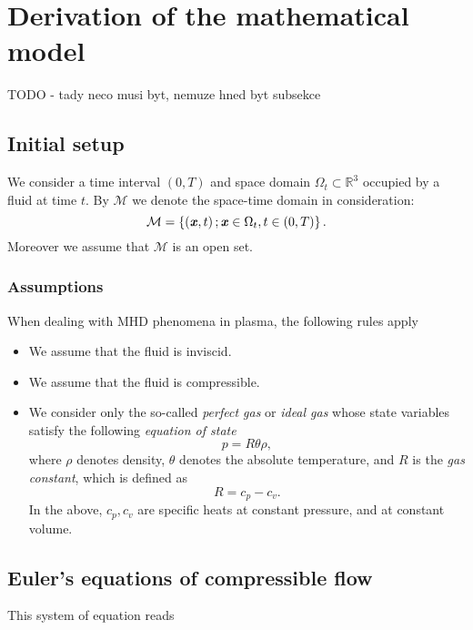 \section{Derivation of the mathematical model}
TODO - tady neco musi byt, nemuze hned byt subsekce
\subsection{Initial setup}

We consider a time interval $\left(0,T\right)$ and space domain $\Omega_{t}\subset \mathbb{R}^3$ occupied by a fluid at time $t$.
By $\mathcal{M}$ we denote the space-time domain in consideration: 
\begin{equation}\label{M}
\mathcal{M}=\left\{\left(\textbf{\textit{x}},t\right);\\\textbf{\textit{x}}\in\Omega_{t},t\in\left(0,T\right)\right \}.
\end{equation}
Moreover we assume that $\mathcal{M}$ is an open set.

\subsubsection{Assumptions}
When dealing with MHD phenomena in plasma, the following rules apply
\begin{itemize}
    \item We assume that the fluid is inviscid.
    \item We assume that the fluid is compressible.
    \item We consider only the so-called \textit{perfect gas} or \textit{ideal gas} whose state variables satisfy the following \textit{equation of state}
    \begin{equation}\label{start_therm}
    p = R\theta\rho,
    \end{equation}
    where $\rho$ denotes density, $\theta$ denotes the absolute temperature, and $R$ is the \textit{gas constant}, which is defined as 
    \begin{equation}
    R = c_p - c_v.
    \end{equation}
    In the above, $c_p, c_v$ are specific heats at constant pressure, and at constant volume.
\end{itemize}

\subsection{Euler's equations of compressible flow}
This system of equation reads


